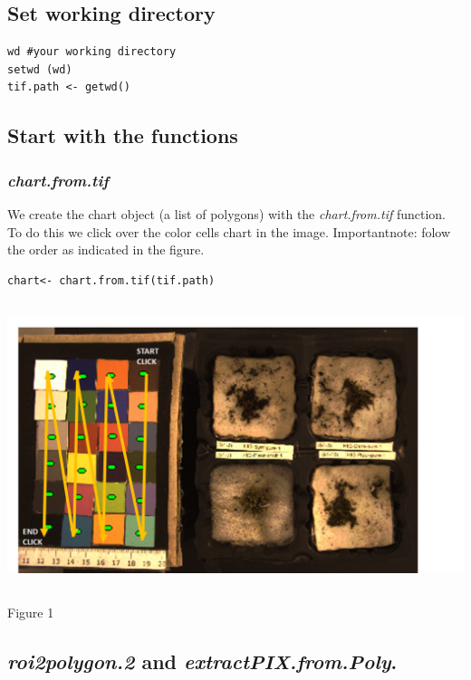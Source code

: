 \documentclass[
]{article}
\begin{document}
\hypertarget{set-working-directory}{%
\subsection{Set working directory}\label{set-working-directory}}

\begin{verbatim}
wd #your working directory
setwd (wd)
tif.path <- getwd()
\end{verbatim}

\hypertarget{start-with-the-functions}{%
\subsection{Start with the functions}\label{start-with-the-functions}}

\hypertarget{chart.from.tif}{%
\subsubsection{\texorpdfstring{\emph{chart.from.tif}}{chart.from.tif}}\label{chart.from.tif}}

We create the chart object (a list of polygons) with the
\emph{chart.from.tif} function. To do this we click over the color cells
chart in the image. Importantnote: folow the order as indicated in the
figure.

\begin{verbatim}
chart<- chart.from.tif(tif.path) 
\end{verbatim}

\includegraphics[width=5.83333in,height=3.28125in]{chart.png}

Figure 1

\hypertarget{roi2polygon.2-and-extractpix.from.poly.}{%
\subsection{\texorpdfstring{\emph{roi2polygon.2} and
\emph{extractPIX.from.Poly}.}{roi2polygon.2 and extractPIX.from.Poly.}}\label{roi2polygon.2-and-extractpix.from.poly.}}
\end{document}
